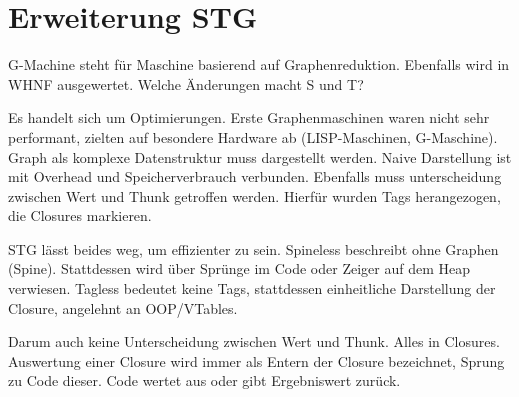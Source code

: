 \section{Erweiterung STG}

G-Machine steht für Maschine basierend auf Graphenreduktion.
Ebenfalls wird in WHNF ausgewertet.
Welche Änderungen macht S und T?

Es handelt sich um Optimierungen.
Erste Graphenmaschinen waren nicht sehr performant, zielten auf besondere Hardware ab (LISP-Maschinen, G-Maschine).
Graph als komplexe Datenstruktur muss dargestellt werden.
Naive Darstellung ist mit Overhead und Speicherverbrauch verbunden.
Ebenfalls muss unterscheidung zwischen Wert und Thunk getroffen werden.
Hierfür wurden Tags herangezogen, die Closures markieren.

STG lässt beides weg, um effizienter zu sein.
Spineless beschreibt ohne Graphen (Spine).
Stattdessen wird über Sprünge im Code oder Zeiger auf dem Heap verwiesen.
Tagless bedeutet keine Tags, stattdessen einheitliche Darstellung der Closure, angelehnt an OOP/VTables.


Darum auch keine Unterscheidung zwischen Wert und Thunk. Alles in Closures.
Auswertung einer Closure wird immer als Entern der Closure bezeichnet, Sprung zu Code dieser.
Code wertet aus oder gibt Ergebniswert zurück.



